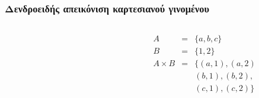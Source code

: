 \begin{comment}
\begin{frame}
\frametitle{Ιδιότητες του γινομένου}
\begin{block}{Αντιμεταθετική ιδιότητα}
\[
r \times s = s \times r
\]
Δηλαδή δεν έχει σημασία η σειρά των τελεσταίων, με οποιαδήποτε σειρά και να γίνει η πράξη
της τομής το αποτέλεσμα είναι το ίδιο.
\end{block}
\begin{block}{Προσεταιριστική ιδιότητα}
\[
r \times (s \times t) = (r \times s) \times t
\]
\end{block}
\end{frame}

\begin{frame}
\frametitle{Παράδειγμα γινομένου με σύνολα}
Αν
\[ A=\{a,b,c\} \]
και \[ B=\{1,2\}\]
τότε
\[
Α \times B = \{(a,1), (a,2), (b,1), (b,2), (c,1), (c,2) \}
\]
Δηλαδή το γινόμενο δύο συνόλων $A$ και $B$ αποτελείται από όλους
τους συνδυασμούς των μελών των $A$ και $B$.
\end{frame}
\end{comment}


\begin{frame}
\frametitle{Δενδροειδής απεικόνιση καρτεσιανού γινομένου}
\begin{minipage}{\wE}
  \begin{columns}[T]
    \begin{column}{0.5\textwidth}
      
    \end{column}
    \begin{column}{0.5\textwidth}
     \begin{align*}
       A &=& \{a,b,c\} \\
       B &=& \{1,2\}  \\
       A \times B &=& \{ (a,1), (a,2) \\
                  &&     (b,1), (b,2), \\
                  &&     (c,1), (c,2) \}
     \end{align*}
    \end{column}
  \end{columns}
\end{minipage}
\end{frame}


